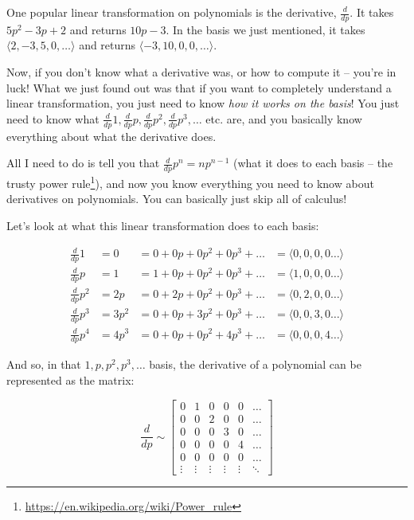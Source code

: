 \documentclass[]{article}
\renewcommand{\href}[2]{#2\footnote{\url{#1}}}
\begin{document}
One popular linear transformation on polynomials is the derivative,
\(\frac{d}{dp}\). It takes \(5 p^2 - 3 p + 2\) and returns \(10 p - 3\). In the
basis we just mentioned, it takes \(\langle 2, -3, 5, 0, \ldots \rangle\) and
returns \(\langle -3, 10, 0, 0, \ldots \rangle\).

Now, if you don't know what a derivative was, or how to compute it -- you're in
luck! What we just found out was that if you want to completely understand a
linear transformation, you just need to know \emph{how it works on the basis}!
You just need to know what \(\frac{d}{dp} 1, \frac{d}{dp} p, \frac{d}{dp} p^2,
\frac{d}{dp} p^3, \ldots\) etc. are, and you basically know everything about
what the derivative does.

All I need to do is tell you that \(\frac{d}{dp} p^n = n p^{n - 1}\) (what it
does to each basis -- the trusty
\href{https://en.wikipedia.org/wiki/Power_rule}{power rule}), and now you know
everything you need to know about derivatives on polynomials. You can basically
just skip all of calculus!

Let's look at what this linear transformation does to each basis:

\[
\begin{aligned}
\frac{d}{dp} 1   & = 0     & = 0 + 0 p + 0 p^2 + 0 p^3 + \ldots
    & = \langle 0, 0, 0, 0 \ldots \rangle  \\
\frac{d}{dp} p   & = 1     & = 1 + 0 p + 0 p^2 + 0 p^3 + \ldots
    & = \langle 1, 0, 0, 0 \ldots \rangle  \\
\frac{d}{dp} p^2 & = 2 p   & = 0 + 2 p + 0 p^2 + 0 p^3 + \ldots
    & = \langle 0, 2, 0, 0 \ldots \rangle  \\
\frac{d}{dp} p^3 & = 3 p^2 & = 0 + 0 p + 3 p^2 + 0 p^3 + \ldots
    & = \langle 0, 0, 3, 0 \ldots \rangle  \\
\frac{d}{dp} p^4 & = 4 p^3 & = 0 + 0 p + 0 p^2 + 4 p^3 + \ldots
    & = \langle 0, 0, 0, 4 \ldots \rangle
\end{aligned}
\]

And so, in that \(1, p, p^2, p^3, \ldots\) basis, the derivative of a polynomial
can be represented as the matrix:

\[
\frac{d}{dp}
\sim
\begin{bmatrix}
0 & 1 & 0 & 0 & 0 & \ldots \\
0 & 0 & 2 & 0 & 0 & \ldots \\
0 & 0 & 0 & 3 & 0 & \ldots \\
0 & 0 & 0 & 0 & 4 & \ldots \\
0 & 0 & 0 & 0 & 0 & \ldots \\
\vdots & \vdots & \vdots & \vdots & \vdots & \ddots
\end{bmatrix}
\]
\end{document}
